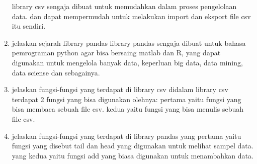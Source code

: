 \begin{enumerate}
        library csv sengaja dibuat untuk memudahkan dalam proses pengelolaan data. dan dapat mempermudah untuk melakukan import dan eksport file csv itu sendiri. 
        \item jelaskan sejarah library pandas
        library pandas sengaja dibuat untuk bahasa pemrograman python agar bisa bersaing matlab dan R, yang dapat digunakan untuk mengelola banyak data, keperluan big data, data mining, data sciense dan sebagainya. 
        \item jelaskan fungsi-fungsi yang terdapat di library csv
        didalam library csv terdapat 2 fungsi yang bisa digunakan olehnya:
        pertama yaitu fungsi yang bisa membaca sebuah file csv.
        kedua yaitu fungsi yang bisa menulis sebuah file csv.
        \item jelaskan fungsi-fungsi yang terdapat di library pandas
        yang pertama yaitu fungsi yang disebut tail dan head yang digunakan untuk melihat sampel data.
        yang kedua yaitu fungsi add yang biasa digunakan untuk menambahkan data. 
\end{enumerate}
